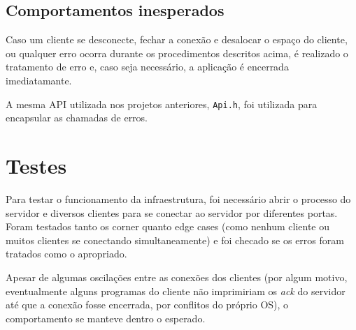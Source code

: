 \documentclass[10pt,twocolumn,letterpaper]{article}
\begin{document}
\subsection{Comportamentos inesperados}

Caso um cliente se desconecte, fechar a conexão e desalocar o espaço do cliente, ou qualquer erro ocorra durante os procedimentos descritos acima, é realizado o tratamento de erro e, caso seja necessário, a aplicação é encerrada imediatamante.

A mesma API utilizada nos projetos anteriores, \texttt{Api.h}, foi utilizada para encapsular as chamadas de erros.

\section{Testes}

Para testar o funcionamento da infraestrutura, foi necessário abrir o processo do servidor e diversos clientes para se conectar ao servidor por diferentes portas. Foram testados tanto os corner quanto edge cases (como nenhum cliente ou muitos clientes se conectando simultaneamente) e foi checado se os erros foram tratados como o apropriado.

Apesar de algumas oscilações entre as conexões dos clientes (por algum motivo, eventualmente alguns programas do cliente não imprimiriam os \textit{ack} do servidor até que a conexão fosse encerrada, por conflitos do próprio OS), o comportamento se manteve dentro o esperado.

{\small


}
\end{document}
